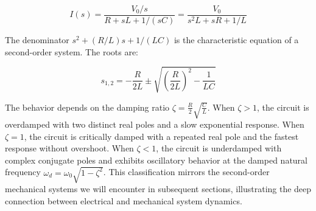 \begin{example}
\begin{equation}
I(s) = \frac{V_0/s}{R + sL + 1/(sC)} = \frac{V_0}{s^2 L + sR + 1/L}
\end{equation}

The denominator $s^2 + (R/L)s + 1/(LC)$ is the characteristic equation of a second-order system. The roots are:

\begin{equation}
s_{1,2} = -\frac{R}{2L} \pm \sqrt{\left(\frac{R}{2L}\right)^2 - \frac{1}{LC}}
\end{equation}

The behavior depends on the damping ratio $\zeta = \frac{R}{2}\sqrt{\frac{C}{L}}$. When $\zeta > 1$, the circuit is overdamped with two distinct real poles and a slow exponential response. When $\zeta = 1$, the circuit is critically damped with a repeated real pole and the fastest response without overshoot. When $\zeta < 1$, the circuit is underdamped with complex conjugate poles and exhibits oscillatory behavior at the damped natural frequency $\omega_d = \omega_0 \sqrt{1 - \zeta^2}$. This classification mirrors the second-order mechanical systems we will encounter in subsequent sections, illustrating the deep connection between electrical and mechanical system dynamics.
\end{example}

